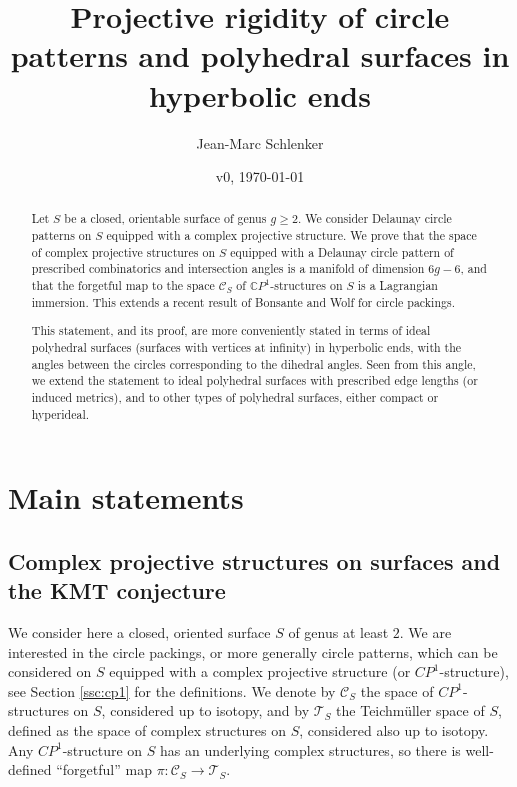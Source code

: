 \documentclass[notitlepage,twoside,a4paper]{amsart}
\title[]{Projective rigidity  of circle patterns and polyhedral surfaces in hyperbolic ends}
\author{Jean-Marc Schlenker}
\date{v0, \today}
\theoremstyle{named}
\newcommand{\CP}{{\mathbb CP}}
\newcommand{\cC}{{\mathcal C}}
\newcommand{\cT}{{\mathcal T}}
\begin{document}
\begin{abstract}
  Let $S$ be a closed, orientable surface of genus $g\geq 2$. We consider Delaunay circle patterns on $S$ equipped with a complex projective structure. We prove that the space of complex projective structures on $S$ equipped with a Delaunay circle pattern of prescribed combinatorics and intersection angles is a manifold of dimension $6g-6$, and that the forgetful map to the space $\cC_S$ of $\CP^1$-structures on $S$ is a Lagrangian immersion. This extends a recent result of Bonsante and Wolf for circle packings.

  This statement, and its proof, are more conveniently stated in terms of ideal polyhedral surfaces (surfaces with vertices at infinity) in hyperbolic ends, with the angles between the circles corresponding to the dihedral angles. Seen from this angle, we extend the statement to ideal polyhedral surfaces with prescribed edge lengths (or induced metrics), and to other types of polyhedral surfaces, either compact or hyperideal. 
\end{abstract}

\maketitle

\tableofcontents
 
\section{Main statements}

\subsection{Complex projective structures on surfaces and the KMT conjecture}
\label{ssc:kmt}

We consider here a closed, oriented surface $S$ of genus at least $2$. We are interested in the circle packings, or more generally circle patterns, which can be considered on $S$ equipped with a complex projective structure (or $CP^1$-structure), see Section \ref{ssc:cp1} for the definitions. We denote by $\cC_S$ the space of $CP^1$-structures on $S$, considered up to isotopy, and by $\cT_S$ the Teichm\"uller space of $S$, defined as the space of complex structures on $S$, considered also up to isotopy. Any $CP^1$-structure on $S$ has an underlying complex structures, so there is well-defined ``forgetful'' map $\pi:\cC_S\to \cT_S$.
\end{document}
